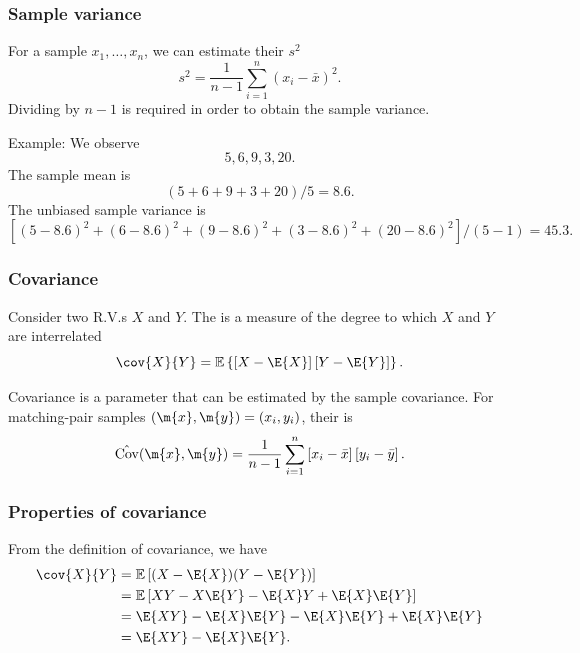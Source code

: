 \documentclass[compress]{beamer}\usepackage[]{graphicx}\usepackage[]{xcolor}
\begin{document}
\begin{frame}[fragile]
  \frametitle{Sample variance}
    For a sample $x_1, \dots, x_n$, we can estimate their  $s^2$
      \[ s^2 = \frac{1}{n-1} \sum_{i=1}^n (x_i - \bar{x})^2. \]
  Dividing by $n - 1$ is required in order to obtain the  sample variance.

  Example: We observe
    \[ 5, 6, 9, 3, 20. \]
  The sample mean is
    \[ (5 + 6 + 9 + 3 + 20) / 5 = 8.6. \]
  The unbiased sample variance is
  \[ [(5 - 8.6)^2 + (6 - 8.6)^2 + (9 - 8.6)^2 + (3 - 8.6)^2 + (20 - 8.6)^2] / (5 - 1) = 45.3. \]
\end{frame}


\begin{frame}[fragile]
  \frametitle{Covariance}
    Consider two R.V.s $X$ and $Y$. The  is a measure of the degree to which $X$ and $Y$ are interrelated
      \begin{equation*}
        \cov{X}{Y} = \mathbb{E} \left\{
              \left[ X - \E{X} \right]
              \left[ Y - \E{Y} \right]
            \right\}.
      \end{equation*}

      Covariance is a parameter that can be estimated by the sample covariance. For matching-pair samples $(\m{x},\m{y})=(x_i, y_i)$, their  is
        \begin{equation*}
          \hat{\mathrm{Cov}}(\m{x},\m{y}) = \frac{1}{n-1} \sum_{i=1}^n
            \left[ x_i - \bar{x} \right]
            \left[ y_i - \bar{y} \right].
        \end{equation*}
\end{frame}


\begin{frame}[fragile]
  \frametitle{Properties of covariance}
    From the definition of covariance, we have
    \begin{equation*}
      \begin{aligned}
        \cov{X}{Y} &= \mathbb{E} \left[ (X - \E{X}) (Y - \E{Y}) \right] \\
        &= \mathbb{E} \left[ XY - X\E{Y} - \E{X}Y + \E{X}\E{Y} \right] \\
        &= \E{XY} - \E{X}\E{Y} - \E{X}\E{Y} + \E{X}\E{Y} \\
        &= \E{XY} - \E{X}\E{Y}.
      \end{aligned}
  \end{equation*}
\end{frame}
\end{document}
